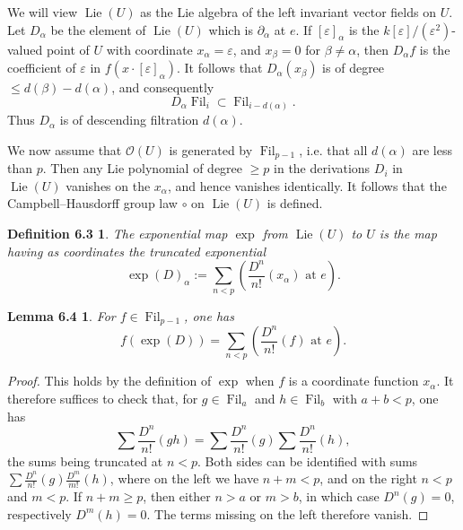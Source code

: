 \documentclass[11pt]{article}
\newcommand{\Lie}{\operatorname{Lie}}
\providecommand{\Fil}{\operatorname{Fil}}
\newtheorem*{definition63}{Definition 6.3}
\newtheorem*{lemma64}{Lemma 6.4}
\providecommand{\OO}{\mathcal O}
\begin{document}
We will view \(\Lie(U)\) as the Lie algebra of the left invariant vector fields on \(U\). Let
\(D_\alpha\) be the element of \(\Lie(U)\) which is \(\partial_\alpha\) at \(e\). If
\([\varepsilon]_\alpha\) is the \(k[\varepsilon]/(\varepsilon^2)\)-valued point of \(U\) with
coordinate \(x_\alpha=\varepsilon\), and \(x_\beta=0\) for \(\beta\ne\alpha\), then
\(D_\alpha f\) is the coefficient of \(\varepsilon\) in \(f(x\cdot[\varepsilon]_\alpha)\). It follows that
\(D_\alpha(x_\beta)\) is of degree \(\le d(\beta)-d(\alpha)\), and consequently
\begin{equation}
  D_\alpha\Fil_i\subset \Fil_{i-d(\alpha)}.
  \tag{6.2.2}
\end{equation}
Thus \(D_\alpha\) is of descending filtration \(d(\alpha)\).

We now assume that \(\OO(U)\) is generated by \(\Fil_{p-1}\), i.e. that all \(d(\alpha)\) are
less than \(p\). Then any Lie polynomial of degree \(\ge p\) in the derivations \(D_i\) in
\(\Lie(U)\) vanishes on the \(x_\alpha\), and hence vanishes identically. It follows that the
Campbell--Hausdorff group law \(\circ\) on \(\Lie(U)\) is defined.

\begin{definition63}
The exponential map \(\exp\) from \(\Lie(U)\) to \(U\) is the map having as coordinates the
truncated exponential
\begin{equation}
  \exp(D)_\alpha:=\sum_{n<p}\left(\frac{D^n}{n!}(x_\alpha)\text{ at }e\right).
  \tag{6.3.1}
\end{equation}
\end{definition63}

\begin{lemma64}
For \(f\in\Fil_{p-1}\), one has
\begin{equation}
  f(\exp(D))=\sum_{n<p}\left(\frac{D^n}{n!}(f)\text{ at }e\right).
  \tag{6.4.1}
\end{equation}
\end{lemma64}

\begin{proof}
This holds by the definition of \(\exp\) when \(f\) is a coordinate function \(x_\alpha\). It
therefore suffices to check that, for \(g\in\Fil_a\) and \(h\in\Fil_b\) with \(a+b<p\), one has
\begin{equation}
  \sum\frac{D^n}{n!}(gh)=\sum\frac{D^n}{n!}(g)\sum\frac{D^n}{n!}(h),
  \tag{6.4.2}
\end{equation}
the sums being truncated at \(n<p\). Both sides can be identified with sums
\(\sum \frac{D^n}{n!}(g)\frac{D^m}{m!}(h)\), where on the left we have \(n+m<p\), and on the
right \(n<p\) and \(m<p\). If \(n+m\ge p\), then either \(n>a\) or \(m>b\), in which case
\(D^n(g)=0\), respectively \(D^m(h)=0\). The terms missing on the left therefore vanish.
\end{proof}
\end{document}
